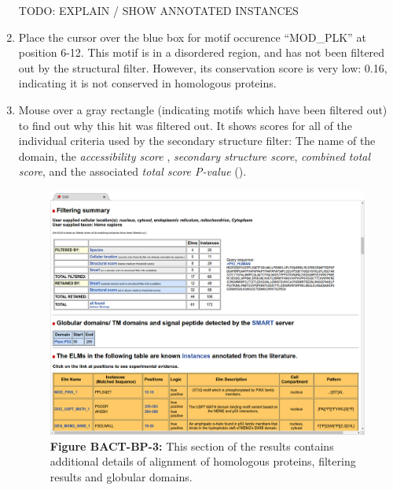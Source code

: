 \begin{enumerate}
TODO: EXPLAIN / SHOW ANNOTATED INSTANCES


\item Place the cursor over the blue box for motif occurence ``MOD\_PLK'' at
	position 6-12. This motif is in a disordered region, and has not been
	filtered out by the structural filter. However, its conservation score
	is very low: 0.16, indicating it is not conserved in homologous
	proteins.


\item Mouse over a gray rectangle (indicating motifs which have been filtered
	out) to find out why this hit was filtered out. It shows scores for all
	of the individual criteria used by the secondary structure filter: The
	name of the domain, the \emph{accessibility score} , \emph{secondary
	structure score}, \emph{combined total score}, and the associated
	\emph{total score P-value} (\cite{19852836}).

\begin{figure}[h!]
	\centering
	\includegraphics[width=\textwidth]{Figures/predicting_p53/elm_results_alignments_filtering_domains.png}
	\caption{
	\textbf{Figure BACT-BP-3:}
	This section of the results contains
	additional details of alignment of homologous proteins, filtering
	results and globular domains.
	}
	\label{predicting_p53_elm_results_alignemnt_filtering_domains}
\end{figure}


\end{enumerate}
